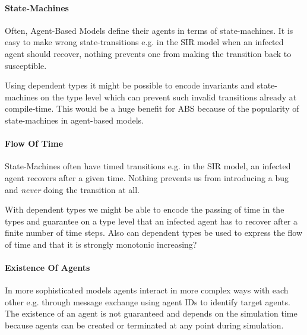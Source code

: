 
\paragraph{State-Machines}
Often, Agent-Based Models define their agents in terms of state-machines. It is easy to make wrong state-transitions e.g. in the SIR model when an infected agent should recover, nothing prevents one from making the transition back to susceptible. 

Using dependent types it might be possible to encode invariants and state-machines on the type level which can prevent such invalid transitions already at compile-time. This would be a huge benefit for ABS because of the popularity of state-machines in agent-based models.

\paragraph{Flow Of Time}
State-Machines often have timed transitions e.g. in the SIR model, an infected agent recovers after a given time. Nothing prevents us from introducing a bug and \textit{never} doing the transition at all.

With dependent types we might be able to encode the passing of time in the types and guarantee on a type level that an infected agent has to recover after a finite number of time steps. Also can dependent types be used to express the flow of time and that it is strongly monotonic increasing?
	
\paragraph{Existence Of Agents}
In more sophisticated models agents interact in more complex ways with each other e.g. through message exchange using agent IDs to identify target agents. The existence of an agent is not guaranteed and depends on the simulation time because agents can be created or terminated at any point during simulation. 

